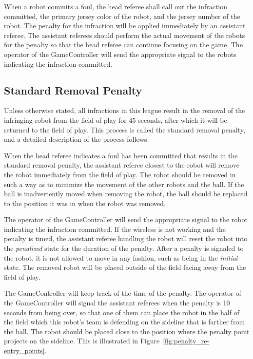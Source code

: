 \documentclass[12pt]{article}
\begin{document}
When a robot commits a foul, the head referee shall call out the infraction committed, the primary jersey color of the robot, and the jersey number of the robot. The penalty for the infraction will be applied immediately by an assistant referee. The assistant referees should perform the actual movement of the robots for the penalty so that the head referee can continue focusing on the game. The operator of the GameController will send the appropriate signal to the robots indicating the infraction committed.

\subsection{Standard Removal Penalty}
\label{sec:removal_penalty}

Unless otherwise stated, all infractions in this league result in the removal of the infringing robot from the field of play for 45 seconds, after which it will be returned to the field of play. This process is called the standard removal penalty, and a detailed description of the process follows.

When the head referee indicates a foul has been committed that results in the standard removal penalty, the assistant referee closest to the robot will remove the robot immediately from the field of play. The robot should be removed in such a way as to minimize the movement of the other robots and the ball. If the ball is inadvertently moved when removing the robot, the ball should be replaced to the position it was in when the robot was removed.

The operator of the GameController will send the appropriate signal to the robot indicating the infraction committed. If the wireless is not working and the penalty is timed, the assistant referee handling the robot will reset the robot into the \emph{penalized} state for the duration of the penalty. After a penalty is signaled to the robot, it is not allowed to move in any fashion, such as being in the \emph{initial} state. The removed robot will be placed outside of the field facing away from the field of play.

The GameController will keep track of the time of the penalty. The operator of the GameController will signal the assistant referees when the penalty is 10 seconds from being over, so that one of them can place the robot in the half of the field which this robot's team is defending on the sideline that is farther from the ball. The robot should be placed close to the position where the penalty point projects on the sideline. This is illustrated in Figure~\ref{fig:penalty_re-entry_points}. 
\end{document}

